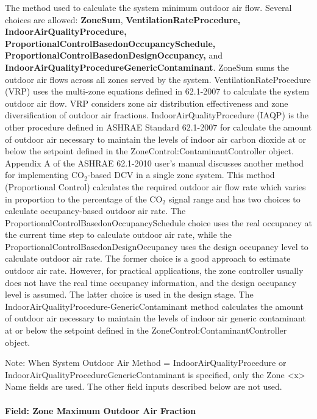 The method used to calculate the system minimum outdoor air flow. Several choices are allowed: \textbf{ZoneSum}, \textbf{VentilationRateProcedure,} \textbf{IndoorAirQualityProcedure, ProportionalControlBasedonOccupancySchedule,} \textbf{ProportionalControlBasedonDesignOccupancy,} and \textbf{IndoorAirQualityProcedureGenericContaminant}. ZoneSum sums the outdoor air flows across all zones served by the system. VentilationRateProcedure (VRP) uses the multi-zone equations defined in 62.1-2007 to calculate the system outdoor air flow. VRP considers zone air distribution effectiveness and zone diversification of outdoor air fractions. IndoorAirQualityProcedure (IAQP) is the other procedure defined in ASHRAE Standard 62.1-2007 for calculate the amount of outdoor air necessary to maintain the levels of indoor air carbon dioxide at or below the setpoint defined in the ZoneControl:ContaminantController object. Appendix A of the ASHRAE 62.1-2010 user's manual discusses another method for implementing CO\(_{2}\)-based DCV in a single zone system. This method (Proportional Control) calculates the required outdoor air flow rate which varies in proportion to the percentage of the CO\(_{2}\) signal range and has two choices to calculate occupancy-based outdoor air rate. The ProportionalControlBasedonOccupancySchedule choice uses the real occupancy at the current time step to calculate outdoor air rate, while the ProportionalControlBasedonDesignOccupancy uses the design occupancy level to calculate outdoor air rate. The former choice is a good approach to estimate outdoor air rate. However, for practical applications, the zone controller usually does not have the real time occupancy information, and the design occupancy level is assumed. The latter choice is used in the design stage. The IndoorAirQualityProcedure-GenericContaminant method calculates the amount of outdoor air necessary to maintain the levels of indoor air generic contaminant at or below the setpoint defined in the ZoneControl:ContaminantController object.

Note: When System Outdoor Air Method = IndoorAirQualityProcedure or IndoorAirQualityProcedureGenericContaminant is specified, only the Zone \textless{}x\textgreater{} Name fields are used. The other field inputs described below are not used.

\paragraph{Field: Zone Maximum Outdoor Air Fraction}\label{field-zone-maximum-outdoor-air-fraction}

